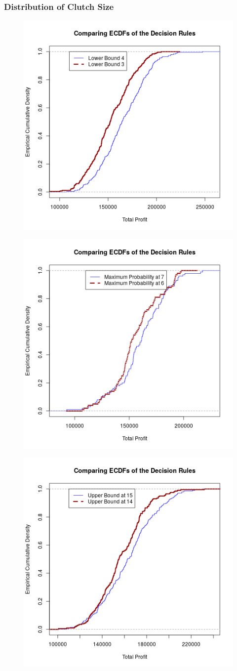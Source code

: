 \documentclass{article}
\begin{document}
		\subsubsection*{Distribution of Clutch Size}
		\begin{multicols}{2}
		\begin{figure}[H]
		\centering
		\includegraphics[width=.5\textwidth]{lbECDF.png}
		\end{figure}
		\begin{figure}[H]
		\centering
		\includegraphics[width=.5\textwidth]{maxECDF.png}
		\end{figure}
		\end{multicols}
		\begin{multicols}{2}
		
		
		\begin{figure}[H]
		\centering
		\includegraphics[width=.5\textwidth]{ubECDF.png}
		\end{figure}
		\end{multicols}
\end{document}

